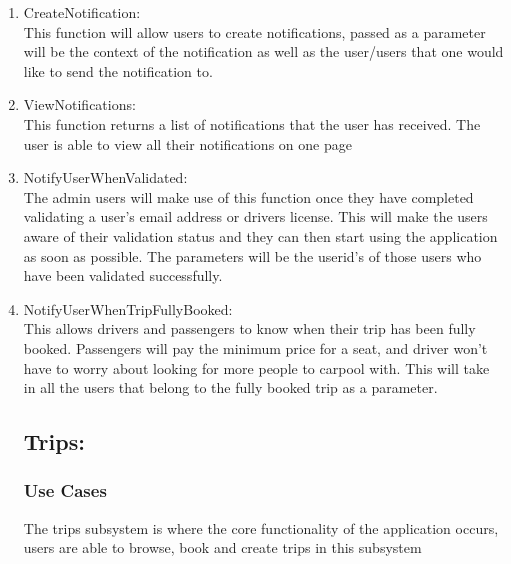 \documentclass[hidelinks, 12pt, a4paper]{article}
\begin{document}
             \begin{enumerate}[label=U1.\arabic*]

                \item CreateNotification:\\
                    This function will allow users to create notifications, passed as a parameter will be the context of the notification as well as the user/users that one would like to send the notification to.\\

                \item ViewNotifications:\\
                	This function returns a list of notifications that the user has received. The user is able to view all their notifications on one page\\

                \item NotifyUserWhenValidated:\\
                    The admin users will make use of this function once they have completed validating a user’s email address or drivers license. This will make the users aware of their validation status and they can then start using the application as soon as possible. The parameters will be the userid’s of those users who have been validated successfully.\\
                	
                \item NotifyUserWhenTripFullyBooked: \\
                    This allows drivers and passengers to know when their trip has been fully booked. Passengers will pay the minimum price for a seat, and driver won’t have to worry about looking for more people to carpool with. This will take in all the users that belong to the fully booked trip as a parameter.\\
               
    
\newpage
                \subsection{Trips:}
                \subsubsection{Use Cases}
                    The trips subsystem is where the core functionality of the application occurs, users are able to browse, book and create trips in this subsystem
                    

\end{enumerate}
\end{document}
